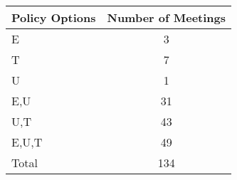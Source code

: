 \begin{tabular}{lc}
\hline\hline 
\addlinespace 
Policy Options & Number of Meetings \\ 
\hline 
E & 3 \\
T & 7 \\
U & 1 \\
E,U & 31 \\
U,T & 43 \\
E,U,T & 49 \\
\addlinespace 
Total & 134 \\
\hline 
\end{tabular}